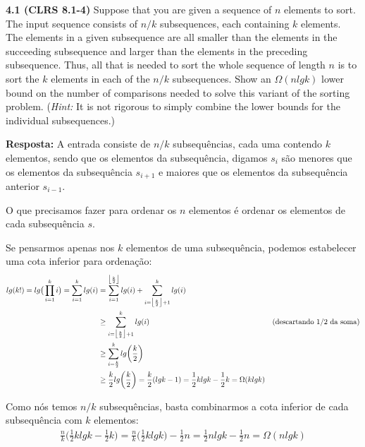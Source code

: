 
\noindent \textbf{4.1 (CLRS 8.1-4)} Suppose that you are given a sequence of $n$ elements to sort. The input sequence
consists of $n/k$ subsequences, each containing $k$ elements. The elements in a given subsequence are all smaller than the elements in the succeeding subsequence and larger than the elements in the preceding subsequence. Thus, all that is needed to sort the whole sequence of length $n$ is to sort the $k$ elements in each of the $n/k$ subsequences. Show an $\Omega(n lg k)$ lower bound on the number of comparisons needed to solve this variant of the sorting problem. (\textit{Hint:} It is not rigorous to simply combine the lower bounds for the individual subsequences.)

\textbf{Resposta:} A entrada consiste de $n/k$ subsequências, cada uma contendo $k$ elementos, sendo que os elementos da subsequência, digamos $s_i$ são menores que os elementos da subsequência $s_{i+1}$ e maiores que os elementos da subsequência anterior $s_{i-1}$.

O que precisamos fazer para ordenar os $n$ elementos é ordenar os elementos de cada subsequência $s$.

Se pensarmos apenas nos $k$ elementos de uma subsequência, podemos estabelecer uma cota inferior para ordenação:
\begin{align*}
lg(k!) = lg\big(\prod_{i=1}^k i\big) = \sum_{i=1}^k lg(i) &= \sum_{i=1}^{\big\lfloor\frac{k}{2}\big\rfloor} lg(i) + \sum_{i=\big\lfloor\frac{k}{2}\big\rfloor + 1}^k lg(i) \\
&\geq \sum_{i=\big\lfloor\frac{k}{2}\big\rfloor + 1}^k lg(i) & \text{(descartando 1/2 da soma)} \\
&\geq \sum_{i=\frac{k}{2}}^k lg\bigg(\dfrac{k}{2}\bigg) \\
&\geq \frac{k}{2} lg\bigg(\dfrac{k}{2}\bigg) = \frac{k}{2} (lgk - 1) = \frac{1}{2}klgk - \frac{1}{2}k = \Omega(k lg k)
\end{align*}

Como nós temos $n/k$ subsequências, basta combinarmos a cota inferior de cada subsequência com $k$ elementos:
\begin{align*}
\frac{n}{k} \bigg(\frac{1}{2}klgk - \frac{1}{2}k \bigg) = \frac{n}{k} \bigg(\frac{1}{2}klgk \bigg) - \frac{1}{2}n = \frac{1}{2}nlgk - \frac{1}{2}n = \Omega(n lg k)
\end{align*}